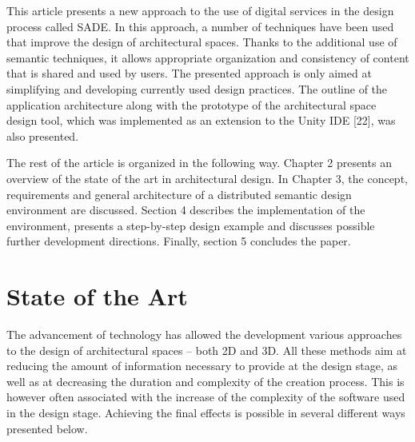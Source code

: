 \documentclass[runningheads]{llncs}
\begin{document}
This article presents a new approach to the use of digital services in the design process called SADE. In this approach, a number of techniques have been used that improve the design of architectural spaces. Thanks to the additional use of semantic techniques, it allows appropriate organization and consistency of content that is shared and used by users. The presented approach is only aimed at simplifying and developing currently used design practices. The outline of the application architecture along with the prototype of the architectural space design tool, which was implemented as an extension to the Unity IDE [22], was also presented.

The rest of the article is organized in the following way. Chapter 2 presents an overview of the state of the art in architectural design. In Chapter 3, the concept, requirements and general architecture of a distributed semantic design environment are discussed. Section 4 describes the implementation of the environment, presents a step-by-step design example and discusses possible further development directions.
Finally, section 5 concludes the paper.

\section{State of the Art}
The advancement of technology has allowed the development various approaches to the design of architectural spaces – both 2D and 3D. All these methods aim at reducing the amount of information necessary to provide at the design stage, as well as at decreasing the duration and complexity of the creation process. This is however often associated with the increase of the complexity of the software used in the design stage. Achieving the final effects is possible in several different ways presented below.
\end{document}
